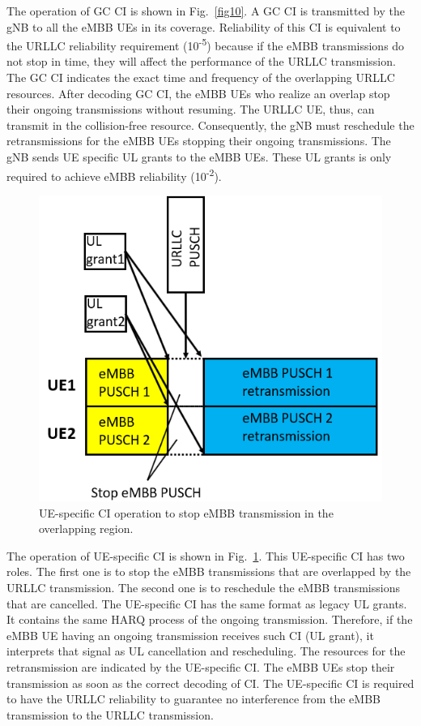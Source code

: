 \documentclass{ieeeaccess}
\begin{document}
The operation of GC CI is shown in Fig.~\ref{fig10}. A GC CI is transmitted by the gNB to all the eMBB UEs in its coverage. Reliability of this CI is equivalent to the URLLC reliability requirement (10\textsuperscript{-5}) because if the eMBB transmissions do not stop in time, they will affect the performance of the URLLC transmission. The GC CI indicates the exact time and frequency of the overlapping URLLC resources. After decoding GC CI, the eMBB UEs who realize an overlap stop their ongoing transmissions without resuming. The URLLC UE, thus, can transmit in the collision-free resource. Consequently, the gNB must reschedule the retransmissions for the eMBB UEs stopping their ongoing transmissions. The gNB sends UE specific UL grants to the eMBB UEs. These UL grants is only required to achieve eMBB reliability (10\textsuperscript{-2}).

\begin{figure}[htbp]
\centerline{\includegraphics[scale=0.4]{fig11.PNG}}
\caption{UE-specific CI operation to stop eMBB transmission in the overlapping region.}
\label{fig11}
\vspace{-2mm}
\end{figure}

The operation of UE-specific CI is shown in Fig.~\ref{fig11}. This UE-specific CI has two roles. The first one is to stop the eMBB transmissions that are overlapped by the URLLC transmission. The second one is to reschedule the eMBB transmissions that are cancelled. The UE-specific CI has the same format as legacy UL grants. It contains the same HARQ process of the ongoing transmission. Therefore, if the eMBB UE having an ongoing transmission receives such CI (UL grant), it interprets that signal as UL cancellation and rescheduling. The resources for the retransmission are indicated by the UE-specific CI. The eMBB UEs stop their transmission as soon as the correct decoding of CI. The UE-specific CI is required to have the URLLC reliability to guarantee no interference from the eMBB transmission to the URLLC transmission.
\end{document}
